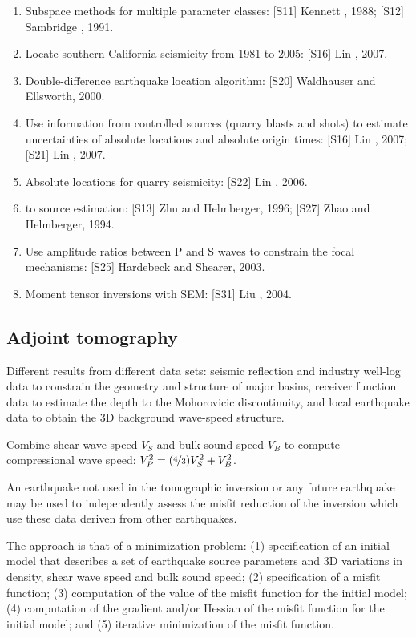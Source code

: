 \begin{enumerate}[\hspace{10mm}*]
  \item Subspace methods for multiple parameter classes:
    [S11] Kennett \etal, 1988; [S12] Sambridge \etal, 1991.
  \item Locate southern California seismicity from 1981 to 2005: [S16] Lin \etal, 2007.
  \item Double-difference earthquake location algorithm: [S20] Waldhauser and Ellsworth, 2000.
  \item Use information from controlled sources (quarry blasts and shots)
    to estimate uncertainties of absolute locations and absolute origin times:
    [S16] Lin \etal, 2007; [S21] Lin \etal, 2007.
  \item Absolute locations for quarry seismicity: [S22] Lin \etal, 2006.
  \item {} to source estimation:
    [S13] Zhu and Helmberger, 1996; [S27] Zhao and Helmberger, 1994.
  \item Use amplitude ratios between P and S waves to constrain the focal mechanisms:
    [S25] Hardebeck and Shearer, 2003.
  \item Moment tensor inversions with SEM: [S31] Liu \etal, 2004.
\end{enumerate}

\subsection{Adjoint tomography}
Different results from different data sets:
seismic reflection and industry well-log data
to constrain the geometry and structure of major basins,
receiver function data to estimate the depth to the Mohorovicic discontinuity,
and local earthquake data to obtain the 3D background wave-speed structure.

Combine shear wave speed $V_S$ and bulk sound speed $V_B$
to compute compressional wave speed: $V_P^2=(\nicefrac{4}{3})V_S^2+V_B^2$.

An earthquake not used in the tomographic inversion or any future earthquake
may be used to independently assess the misfit reduction of the inversion
which use these data deriven from other earthquakes.

The approach is that of a minimization problem:
(1) specification of an initial model that describes a set of earthquake source parameters
and 3D variations in density, shear wave speed and bulk sound speed;
(2) specification of a misfit function;
(3) computation of the value of the misfit function for the initial model;
(4) computation of the gradient and/or Hessian of the misfit function for the initial model;
and (5) iterative minimization of the misfit function.


